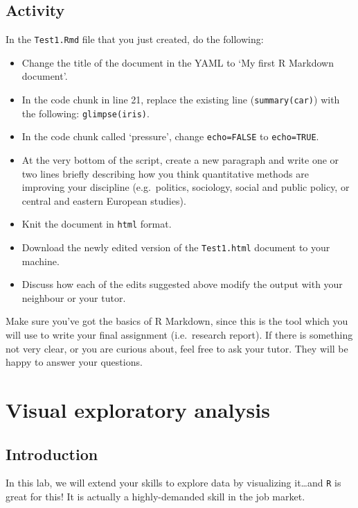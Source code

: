 \documentclass[
]{book}
\providecommand{\tightlist}{%
  \setlength{\itemsep}{0pt}\setlength{\parskip}{0pt}}
\begin{document}
\hypertarget{activity-5}{%
\section{Activity}\label{activity-5}}

In the \texttt{Test1.Rmd} file that you just created, do the following:

\begin{itemize}
\tightlist
\item
  Change the title of the document in the YAML to `My first R Markdown document'.
\item
  In the code chunk in line 21, replace the existing line (\texttt{summary(car)}) with the following: \texttt{glimpse(iris)}.
\item
  In the code chunk called `pressure', change \texttt{echo=FALSE} to \texttt{echo=TRUE}.
\item
  At the very bottom of the script, create a new paragraph and write one or two lines briefly describing how you think quantitative methods are improving your discipline (e.g.~politics, sociology, social and public policy, or central and eastern European studies).
\item
  Knit the document in \texttt{html} format.
\item
  Download the newly edited version of the \texttt{Test1.html} document to your machine.
\item
  Discuss how each of the edits suggested above modify the output with your neighbour or your tutor.
\end{itemize}

Make sure you've got the basics of R Markdown, since this is the tool which you will use to write your final assignment (i.e.~research report). If there is something not very clear, or you are curious about, feel free to ask your tutor. They will be happy to answer your questions.

\hypertarget{visual-exploratory-analysis}{%
\chapter{Visual exploratory analysis}\label{visual-exploratory-analysis}}

\hypertarget{introduction-1}{%
\section{Introduction}\label{introduction-1}}

In this lab, we will extend your skills to explore data by visualizing it\ldots and \texttt{R} is great for this! It is actually a highly-demanded skill in the job market.
\end{document}

